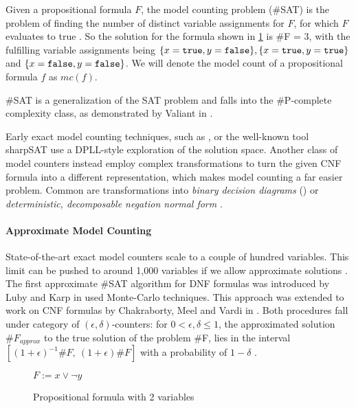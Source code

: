 Given a propositional formula $F$, the model counting problem (\#SAT) is the problem of finding the number of distinct variable assignments for $F$, for which $F$ evaluates to true \cite{biere09}. So the solution for the formula shown in  \ref{fig:satEx} is \#F = 3, with the fulfilling variable assignments being $\{ x = \mathtt{true}, y = \mathtt{false}\}, \{x = \mathtt{true}, y = \mathtt{true}\}$ and  $\{x = \mathtt{false}, y = \mathtt{false}\}$. We will denote the model count of a propositional formula $f$ as $mc(f)$.

\#SAT is a generalization of the SAT problem and falls into the \#P-complete complexity class, as demonstrated by Valiant in \cite{valiant79}.

Early exact model counting techniques, such as \cite{birnbaum99}, or the well-known tool sharpSAT \cite{thurley06} use a DPLL-style exploration of the solution space. Another class of model counters instead employ complex transformations to turn the given CNF formula into a different representation, which makes model counting a far easier problem. Common are transformations into \emph{binary decision diagrams} () or \emph{deterministic, decomposable negation normal form} \cite{darwiche04}.

\paragraph*{Approximate Model Counting}
State-of-the-art exact model counters scale to a couple of hundred variables.  This limit can be pushed to around 1,000 variables if we allow approximate solutions \cite{biere09}.
The first approximate \#SAT algorithm for DNF formulas was introduced by Luby and Karp in \cite{karp89} used Monte-Carlo techniques. This approach was extended to work on CNF formulas by Chakraborty, Meel and Vardi in \cite{chakraborty13}. Both procedures fall under category of $(\epsilon, \delta)$-counters: for $0 < \epsilon, \delta \leq 1$, the approximated solution $\#F_{approx}$ to the true solution of the problem \#F, lies in the interval $[(1 + \epsilon)^{-1} \#F, \: (1 + \epsilon) \#F]$ with a probability of $1 - \delta$ \cite{karp89,chakraborty13}.

\begin{figure}
    \centering
    $F := x \lor \lnot y$
    \caption{Propositional formula with 2 variables}
    \label{fig:satEx}
\end{figure}

